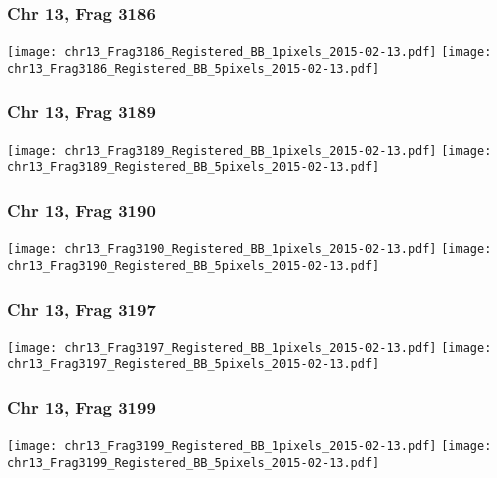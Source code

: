 \documentclass[10pt,dvipsnames,table]{beamer}
\begin{document}
\begin{frame}
\frametitle{Chr 13, Frag 3186}
\begin{center}
\texttt{[image: chr13\_Frag3186\_Registered\_BB\_1pixels\_2015-02-13.pdf]} 
\texttt{[image: chr13\_Frag3186\_Registered\_BB\_5pixels\_2015-02-13.pdf]} 
\end{center}
\end{frame}

\begin{frame}
\frametitle{Chr 13, Frag 3189}
\begin{center}
\texttt{[image: chr13\_Frag3189\_Registered\_BB\_1pixels\_2015-02-13.pdf]} 
\texttt{[image: chr13\_Frag3189\_Registered\_BB\_5pixels\_2015-02-13.pdf]} 
\end{center}
\end{frame}

\begin{frame}
\frametitle{Chr 13, Frag 3190}
\begin{center}
\texttt{[image: chr13\_Frag3190\_Registered\_BB\_1pixels\_2015-02-13.pdf]} 
\texttt{[image: chr13\_Frag3190\_Registered\_BB\_5pixels\_2015-02-13.pdf]} 
\end{center}
\end{frame}

\begin{frame}
\frametitle{Chr 13, Frag 3197}
\begin{center}
\texttt{[image: chr13\_Frag3197\_Registered\_BB\_1pixels\_2015-02-13.pdf]} 
\texttt{[image: chr13\_Frag3197\_Registered\_BB\_5pixels\_2015-02-13.pdf]} 
\end{center}
\end{frame}

\begin{frame}
\frametitle{Chr 13, Frag 3199}
\begin{center}
\texttt{[image: chr13\_Frag3199\_Registered\_BB\_1pixels\_2015-02-13.pdf]} 
\texttt{[image: chr13\_Frag3199\_Registered\_BB\_5pixels\_2015-02-13.pdf]} 
\end{center}
\end{frame}
\end{document}
